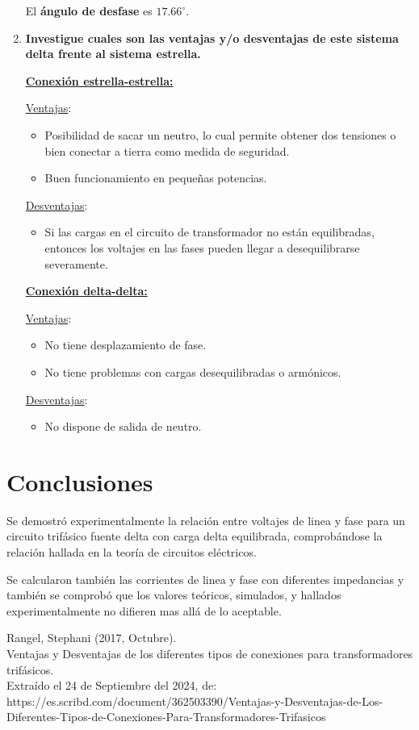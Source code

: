 \documentclass[letter,11pt]{article}
\begin{document}
\begin{enumerate}
El \textbf{ángulo de desfase} es $17.66^{\circ}$.

\item \textbf{Investigue cuales son las ventajas y/o desventajas de este sistema
delta frente al sistema estrella.}

\underline{\textbf{Conexión estrella-estrella:}}

\underline{Ventajas}:
\begin{itemize}
    \item Posibilidad de sacar un neutro, lo cual permite obtener dos tensiones
        o bien conectar a tierra como medida de seguridad.
    \item Buen funcionamiento en pequeñas potencias.
\end{itemize}

\underline{Desventajas}:
\begin{itemize}
    \item Si las cargas en el circuito de transformador no están equilibradas,
        entonces los voltajes en las fases pueden llegar a desequilibrarse
        severamente.
\end{itemize}

\underline{\textbf{Conexión delta-delta:}}

\underline{Ventajas}:
\begin{itemize}
    \item No tiene desplazamiento de fase.
    \item No tiene problemas con cargas desequilibradas o armónicos.
\end{itemize}

\underline{Desventajas}:
\begin{itemize}
    \item No dispone de salida de neutro.
\end{itemize}

\end{enumerate}

\section{Conclusiones}
Se demostró experimentalmente la relación entre voltajes de linea y fase para 
un circuito trifásico fuente delta con carga delta equilibrada, comprobándose la
relación hallada en la teoría de circuitos eléctricos.

Se calcularon también las corrientes de linea y fase con diferentes impedancias
y también se comprobó que los valores teóricos, simulados, y hallados
experimentalmente no difieren mas allá de lo aceptable.

\begin{thebibliography}{99}

 Rangel, Stephani (2017, Octubre).\\
Ventajas y Desventajas de los diferentes tipos de conexiones para transformadores trifásicos.\\
Extraído el 24 de Septiembre del 2024, de:\\
https://es.scribd.com/document/362503390/Ventajas-y-Desventajas-de-Los-Diferentes-Tipos-de-Conexiones-Para-Transformadores-Trifasicos

\end{thebibliography}
\end{document}
